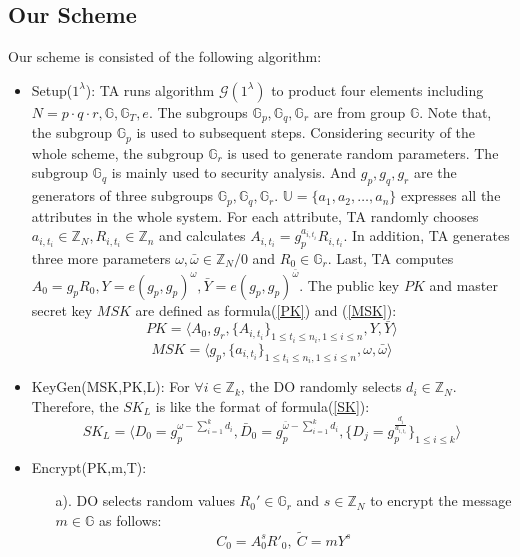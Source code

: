 \documentclass[smallextended]{svjour3}       %
\begin{document}
\subsection{Our Scheme}
Our scheme is consisted of the following algorithm:
\begin{itemize}
	\item Setup($1^\lambda$): TA runs algorithm $\mathcal{G}(1^\lambda)$ to product four elements including $N=p\cdot q \cdot r,\mathbb{G},\mathbb{G}_T,e$. The subgroups $\mathbb{G}_p,\mathbb{G}_q,\mathbb{G}_r$ are from group $\mathbb{G}$. Note that, the subgroup $\mathbb{G}_p$ is used to subsequent steps. Considering security of the whole scheme, the subgroup $\mathbb{G}_r$ is used to generate random parameters. The subgroup $\mathbb{G}_q$ is mainly used to security analysis. And $g_p,g_q,g_r$ are the generators of three subgroups $\mathbb{G}_p,\mathbb{G}_q,\mathbb{G}_r$. $\mathbb{U}=\{a_1,a_2,\dots,a_n\}$ expresses all the attributes in the whole system. For each attribute, TA randomly chooses $a_{i,t_i} \in \mathbb{Z}_N, R_{i,t_i} \in \mathbb{Z}_n$ and calculates $A_{i,t_i}=g_{p}^{a_{i,t_i}}R_{i,t_i}$. In addition, TA generates three more parameters $\omega, \bar{\omega} \in \mathbb{Z}_N/0$ and $R_0 \in \mathbb{G}_r$. Last, TA computes $A_0=g_pR_0,Y=e(g_p,g_p)^{\omega},\bar{Y}=e(g_p,g_p)^{\bar{\omega}}$. The public key $PK$ and master secret key $MSK$ are defined as formula(\ref{PK}) and (\ref{MSK}):  
	\begin{equation}\label{PK}
		PK=\langle A_0,g_r,\{A_{i,t_i}\}_{1\leq t_i \leq n_i, 1 \leq i \leq n},Y,\bar{Y}\rangle
	\end{equation}
	\begin{equation}\label{MSK}
		MSK=\langle g_p,\{a_{i,t_i}\}_{1\leq t_i \leq n_i, 1 \leq i \leq n},\omega,\bar{\omega}\rangle
	\end{equation}
	\item KeyGen(MSK,PK,L): For $\forall i \in \mathbb{Z}_k$, the DO randomly selects $d_i \in \mathbb{Z}_N$. Therefore, the $SK_L$ is like the format of formula(\ref{SK}):
	\begin{equation}\label{SK}
		SK_L=\langle D_0=g_p^{\omega - \sum_{i=1}^{k}d_i}, \bar{D}_0=g_p^{\bar{\omega} - \sum_{i=1}^{k}d_i}, \{D_j=g_p^{\frac{d_i}{a_{i,t_i}}}\}_{1 \leq i \leq k } \rangle
	\end{equation}
	\item Encrypt(PK,m,T): 
		\begin{itemize}
			\item [a).]	DO selects random values $R_0' \in \mathbb{G}_r$ and $s \in \mathbb{Z}_N$ to encrypt the message $m \in \mathbb{G}$ as follows:
						\begin{equation}
							C_0 = A_0^sR'_0, \ \tilde{C} = mY^s
						\end{equation}


\end{itemize}
\end{itemize}
\end{document}

